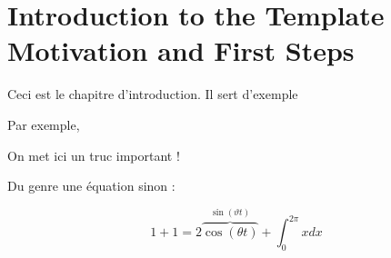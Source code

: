 \chapter[Introduction to the Template: Motivation and First Steps]{Introduction to the Template Motivation and First Steps}
\label{cp:introduction}

Ceci est le chapitre d'introduction. Il sert d'exemple

Par exemple,

\begin{block}[warning]
	On met ici un truc important !
\end{block}

Du genre une équation sinon :

\[1+1=2 \overbrace{\cos(\theta t)}^{\sin(\vartheta t)} + \int_{0}^{2\pi} x dx\]